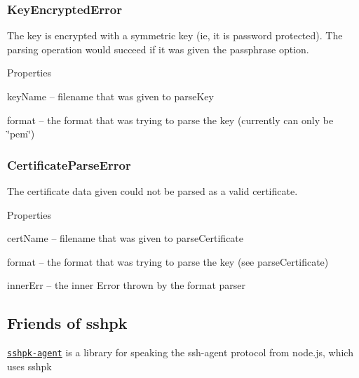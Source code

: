 \subsubsection*{{\ttfamily Key\+Encrypted\+Error}}

The key is encrypted with a symmetric key (ie, it is password protected). The parsing operation would succeed if it was given the {\ttfamily passphrase} option.

Properties


\begin{DoxyItemize}
\item {\ttfamily key\+Name} -- {\ttfamily filename} that was given to {\ttfamily parse\+Key}
\item {\ttfamily format} -- the {\ttfamily format} that was trying to parse the key (currently can only be {\ttfamily \char`\"{}pem\char`\"{}})
\end{DoxyItemize}

\subsubsection*{{\ttfamily Certificate\+Parse\+Error}}

The certificate data given could not be parsed as a valid certificate.

Properties


\begin{DoxyItemize}
\item {\ttfamily cert\+Name} -- {\ttfamily filename} that was given to {\ttfamily parse\+Certificate}
\item {\ttfamily format} -- the {\ttfamily format} that was trying to parse the key (see {\ttfamily parse\+Certificate})
\item {\ttfamily inner\+Err} -- the inner Error thrown by the format parser
\end{DoxyItemize}

\subsection*{Friends of sshpk }


\begin{DoxyItemize}
\item \href{https://github.com/arekinath/node-sshpk-agent}{\tt {\ttfamily sshpk-\/agent}} is a library for speaking the {\ttfamily ssh-\/agent} protocol from node.\+js, which uses {\ttfamily sshpk} 
\end{DoxyItemize}